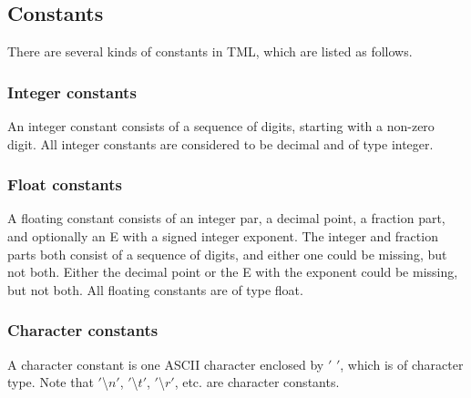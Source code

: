 \documentclass[12pt,psfig,a4]{article}
\begin{document}
%


\subsection {Constants}
There are several kinds of constants in TML, which are listed as follows.
\subsubsection {Integer constants}
An integer constant consists of a sequence of digits, starting with a non-zero digit. All integer constants are considered to be decimal and of type integer.

\subsubsection {Float constants}
A floating constant consists of an integer par, a decimal point, a fraction part, and optionally an E with a signed integer exponent. The integer and fraction parts both consist of a sequence of digits, and either one could be missing, but not both. Either the decimal point or the E with the exponent could be missing, but not both. All floating constants are of type float.

\subsubsection {Character constants}
A character constant is one ASCII character enclosed by $'$ $'$, which is of character type. Note that $'$\textbackslash$n'$, $'$\textbackslash$t'$, $'$\textbackslash$r'$, etc. are character constants.
\end{document}
